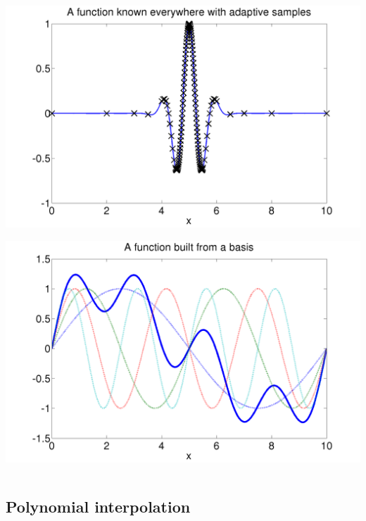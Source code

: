 \documentclass{beamer}
\begin{document}
\begin{frame}
\begin{columns}
\begin{column}{0.5\textwidth}
\begin{overlayarea}{\textwidth}{0.6\textheight}
{\begin{center}
          \end{center}
        }
        {
          \begin{center}
            \includegraphics[width=\textwidth]{figures/QuadAdaptive2}
          \end{center}
        }
        {
          \begin{center}
            \includegraphics[width=\textwidth]{figures/QuadBasis1}
          \end{center}
        }
      \end{overlayarea}
    \end{column}
  \end{columns}

\end{frame}


\subsection{Polynomial interpolation}
\end{document}
